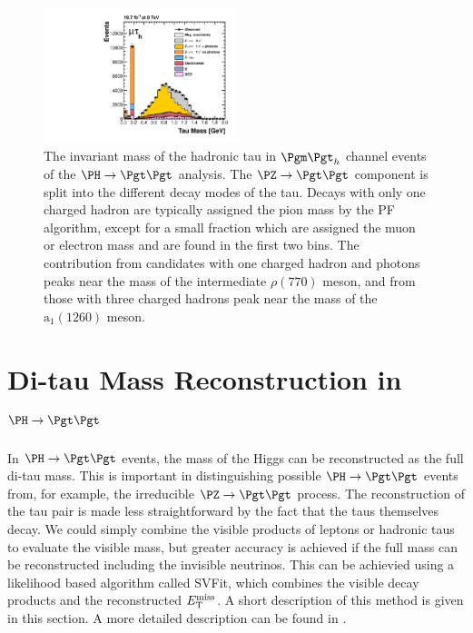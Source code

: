 \begin{figure}[htb]
\begin{center}
    \includegraphics[width=0.5\textwidth]
      {plots/reco/m_2_tau_modes_mt_2012.pdf}
\end{center}
\caption{The invariant mass of the hadronic tau in $\mutau$ channel events of
the $\PH\to\Pgt\Pgt$ analysis. The $\PZ\to\Pgt\Pgt$ component is split into the
different decay modes of the tau. Decays with only one charged hadron are
typically assigned the pion mass by the \ac{PF} algorithm, except for a small
fraction which are assigned the muon or electron mass and are found in the first
two bins. The contribution from candidates with one charged hadron and photons
peaks near the mass of the intermediate $\rho(770)$ meson, and from those with
three charged hadrons peak near the mass of the $\text{a}_{1}(1260)$ meson.}
\label{fig:taumass}
\end{figure}

\section{Di-tau Mass Reconstruction in $\PH \to \Pgt\Pgt$}
\label{sec:svfit}

In $\PH \to \Pgt\Pgt$ events, the mass of the Higgs can be reconstructed as the full 
di-tau mass. This is important in distinguishing possible $\PH\to\Pgt\Pgt$
events from, for example, the irreducible $\PZ \to \Pgt\Pgt$ process. 
The reconstruction of the tau pair is made less straightforward
by the fact that the taus themselves decay. We could simply combine the visible
products of leptons or hadronic taus to evaluate the visible mass,
but greater accuracy is achieved if the full mass can be reconstructed including the
invisible neutrinos. This can be achievied using a likelihood based algorithm called
SVFit, which combines the visible decay products and the reconstructed $E_{\mathrm{T}}^{\text{miss}}$. A
short description of this method is given in this section. A more detailed
description can be found in \cite{HIG-13-004}.

